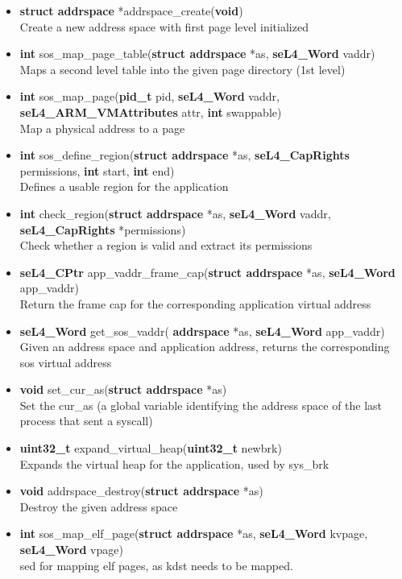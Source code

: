 \documentclass[12pt]{article}
\begin{document}
\begin{itemize}
\item \textbf{struct addrspace} *addrspace\_create(\textbf{void})\\
Create a new address space with first page level initialized
\item \textbf{int} sos\_map\_page\_table(\textbf{struct addrspace} *as, \textbf{seL4\_Word} vaddr)\\
Maps a second level table into the given page directory (1st level)
\item \textbf{int} sos\_map\_page(\textbf{pid\_t} pid, \textbf{seL4\_Word} vaddr, \textbf{seL4\_ARM\_VMAttributes} attr, \textbf{int} swappable)\\
Map a physical address to a page
\item \textbf{int} sos\_define\_region(\textbf{struct addrspace} *as, \textbf{seL4\_CapRights} permissions, \textbf{int} start, \textbf{int} end)\\
Defines a usable region for the application
\item \textbf{int} check\_region(\textbf{struct addrspace} *as, \textbf{seL4\_Word} vaddr, \textbf{seL4\_CapRights} *permissions)\\
Check whether a region is valid and extract its permissions
\item \textbf{seL4\_CPtr} app\_vaddr\_frame\_cap(\textbf{struct addrspace} *as, \textbf{seL4\_Word} app\_vaddr)\\
Return the frame cap for the corresponding application virtual address
\item \textbf{seL4\_Word} get\_sos\_vaddr(\textbf{ addrspace} *as, \textbf{seL4\_Word} app\_vaddr)\\
Given an address space and application address, returns the corresponding sos virtual address
\item \textbf{void} set\_cur\_as(\textbf{struct addrspace} *as)\\
Set the cur\_as (a global variable identifying the address space of the last process that sent a syscall)
\item \textbf{uint32\_t} expand\_virtual\_heap(\textbf{uint32\_t} newbrk)\\
Expands the virtual heap for the application, used by sys\_brk
\item \textbf{void} addrspace\_destroy(\textbf{struct addrspace} *as)\\
Destroy the given address space
\item \textbf{int} sos\_map\_elf\_page(\textbf{struct addrspace} *as, \textbf{seL4\_Word} kvpage, \textbf{seL4\_Word} vpage)\\
sed for mapping elf pages, as kdst needs to be mapped.
\end{itemize}
\end{document}
